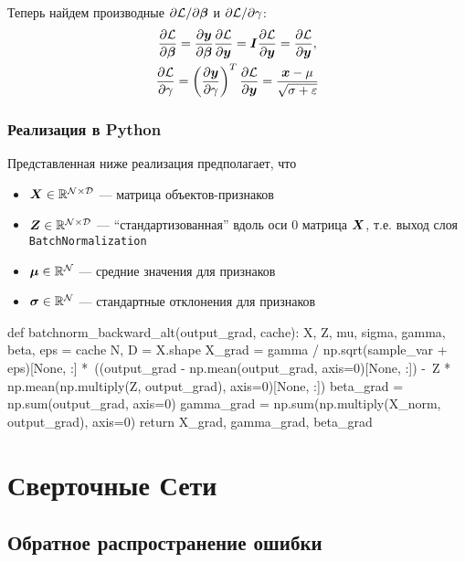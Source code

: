 \documentclass{report}
\numberwithin{theorem}{chapter}
\numberwithin{statement}{chapter}
\numberwithin{lemma}{chapter}
\theoremstyle{definition}
\numberwithin{task}{chapter}
\theoremstyle{remark}
\numberwithin{example}{chapter}
\theoremstyle{definition}
\numberwithin{definition}{chapter}
\theoremstyle{remark}
\theoremstyle{remark}
\numberwithin{lyrics}{section}
\begin{document}
Теперь найдем производные $\partial \mathcal{L} / \partial \boldsymbol{\beta}$ и $\partial \mathcal{L} / \partial \gamma$:
\begin{gather*}
\frac{\partial \mathcal{L} }{\partial \boldsymbol{\beta}} = \frac{\partial \boldsymbol{y} }{\partial \boldsymbol{\beta}} \frac{\partial \mathcal{L} }{\partial \boldsymbol{y}} = \boldsymbol{I} \frac{\partial \mathcal{L} }{\partial \boldsymbol{y}} = \frac{\partial \mathcal{L} }{\partial \boldsymbol{y}}, \\
\frac{\partial \mathcal{L} }{\partial \gamma} = \left(\frac{\partial \boldsymbol{y} }{\partial \gamma}\right)^T \frac{\partial \mathcal{L} }{\partial \boldsymbol{y}} = \frac{\boldsymbol{x} - \mu}{\sqrt{\sigma + \varepsilon}}
\end{gather*}

\subsection{Реализация в Python}

Представленная ниже реализация предполагает, что 
\begin{itemize}
	\item $\boldsymbol{X} \in \mathbb{R}^{\mathcal{N} \times \mathcal{D}}$ --- матрица объектов-признаков
	\item $\boldsymbol{Z} \in \mathbb{R}^{\mathcal{N} \times \mathcal{D}}$ --- ``стандартизованная'' вдоль оси 0 матрица $\boldsymbol{X}$, т.е. выход слоя \texttt{BatchNormalization}
	\item $\boldsymbol{\mu} \in \mathbb{R}^{\mathcal{N}}$ --- средние значения для признаков
	\item $\boldsymbol{\sigma} \in \mathbb{R}^{\mathcal{N}}$ --- стандартные отклонения для признаков
\end{itemize}

\begin{python}
def batchnorm_backward_alt(output_grad, cache):
  X, Z, mu, sigma, gamma, beta, eps = cache
  N, D = X.shape
  X_grad = gamma / np.sqrt(sample_var + eps)[None, :] *\ 
           ((output_grad - np.mean(output_grad, axis=0)[None, :]) -\
           Z * np.mean(np.multiply(Z, output_grad), axis=0)[None, :]) 
  beta_grad = np.sum(output_grad, axis=0)
  gamma_grad = np.sum(np.multiply(X_norm, output_grad), axis=0)
  return X_grad, gamma_grad, beta_grad
\end{python}



\chapter{Сверточные Сети}

\section{Обратное распространение ошибки}
\end{document}
